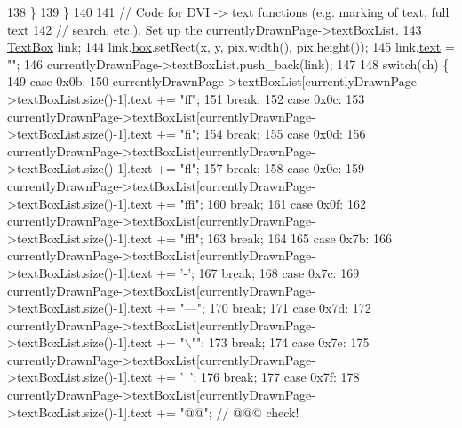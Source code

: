 \begin{DoxyCode}
138     \}
139   \}
140 
141   \textcolor{comment}{// Code for DVI -> text functions (e.g. marking of text, full text}
142   \textcolor{comment}{// search, etc.). Set up the currentlyDrawnPage->textBoxList.}
143   \hyperlink{classTextBox}{TextBox} link;
144   link.\hyperlink{classTextBox_aa383110556fc2ca0e787b9618a333074}{box}.setRect(x, y, pix.width(), pix.height());
145   link.\hyperlink{classTextBox_a60aeb0b354c3e92da942f3fac174da2e}{text} = \textcolor{stringliteral}{""};
146   currentlyDrawnPage->textBoxList.push\_back(link);
147 
148   \textcolor{keywordflow}{switch}(ch) \{
149   \textcolor{keywordflow}{case} 0x0b:
150     currentlyDrawnPage->textBoxList[currentlyDrawnPage->textBoxList.size()-1].text += \textcolor{stringliteral}{"ff"};
151     \textcolor{keywordflow}{break};
152   \textcolor{keywordflow}{case} 0x0c:
153     currentlyDrawnPage->textBoxList[currentlyDrawnPage->textBoxList.size()-1].text += \textcolor{stringliteral}{"fi"};
154     \textcolor{keywordflow}{break};
155   \textcolor{keywordflow}{case} 0x0d:
156     currentlyDrawnPage->textBoxList[currentlyDrawnPage->textBoxList.size()-1].text += \textcolor{stringliteral}{"fl"};
157     \textcolor{keywordflow}{break};
158   \textcolor{keywordflow}{case} 0x0e:
159     currentlyDrawnPage->textBoxList[currentlyDrawnPage->textBoxList.size()-1].text += \textcolor{stringliteral}{"ffi"};
160     \textcolor{keywordflow}{break};
161   \textcolor{keywordflow}{case} 0x0f:
162     currentlyDrawnPage->textBoxList[currentlyDrawnPage->textBoxList.size()-1].text += \textcolor{stringliteral}{"ffl"};
163     \textcolor{keywordflow}{break};
164 
165   \textcolor{keywordflow}{case} 0x7b:
166     currentlyDrawnPage->textBoxList[currentlyDrawnPage->textBoxList.size()-1].text += \textcolor{charliteral}{'-'};
167     \textcolor{keywordflow}{break};
168   \textcolor{keywordflow}{case} 0x7c:
169     currentlyDrawnPage->textBoxList[currentlyDrawnPage->textBoxList.size()-1].text += \textcolor{stringliteral}{"---"};
170     \textcolor{keywordflow}{break};
171   \textcolor{keywordflow}{case} 0x7d:
172     currentlyDrawnPage->textBoxList[currentlyDrawnPage->textBoxList.size()-1].text += \textcolor{stringliteral}{"\(\backslash\)""};
173     \textcolor{keywordflow}{break};
174   \textcolor{keywordflow}{case} 0x7e:
175     currentlyDrawnPage->textBoxList[currentlyDrawnPage->textBoxList.size()-1].text += \textcolor{charliteral}{'~'};
176     \textcolor{keywordflow}{break};
177   \textcolor{keywordflow}{case} 0x7f:
178     currentlyDrawnPage->textBoxList[currentlyDrawnPage->textBoxList.size()-1].text += \textcolor{stringliteral}{"@@"}; \textcolor{comment}{// @@@ check!}

\end{DoxyCode}
